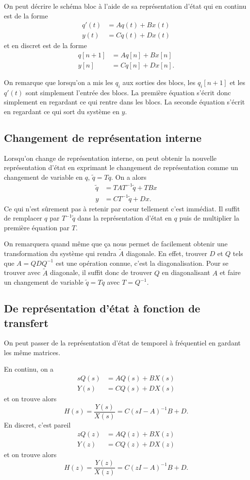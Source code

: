 On peut décrire le schéma bloc à l'aide de sa représentation d'état qui
en continu est de la forme
\begin{align*}
  q'(t) & = Aq(t) + Bx(t)\\
  y(t) & = Cq(t) + Dx(t)
\end{align*}
et en discret est de la forme
\begin{align*}
  q[n+1] & = Aq[n] + Bx[n]\\
  y[n] & = Cq[n] + Dx[n].
\end{align*}

On remarque que lorsqu'on a mis les $q_i$ aux sorties des blocs,
les $q_i[n+1]$ et les $q'(t)$ sont simplement l'entrée des blocs.
La première équation s'écrit donc simplement en regardant ce qui rentre
dans les blocs.
La seconde équation s'écrit en regardant ce qui sort du système en $y$.

\subsection{Changement de représentation interne}
Lorsqu'on change de représentation interne, on peut obtenir
la nouvelle représentation d'état en exprimant le changement de représentation
comme un changement de variable en $q$, $\tilde{q} = Tq$.
On a alors
\begin{align*}
  \tilde{q} & = TAT^{-1}\tilde{q} + TBx\\
  y & = CT^{-1}\tilde{q} + Dx.
\end{align*}
Ce qui n'est sûrement pas à retenir par coeur tellement c'est immédiat.
Il suffit de remplacer $q$ par $T^{-1}\tilde{q}$ dans la représentation d'état
en $q$ puis de multiplier la première équation par $T$.

On remarquera quand même que ça nous permet de facilement obtenir une
transformation du système qui rendra $\tilde{A}$ diagonale.
En effet, trouver $D$ et $Q$ tels que $A = QDQ^{-1}$ est une opération connue,
c'est la diagonalisation.
Pour se trouver avec $\tilde{A}$ diagonale,
il suffit donc de trouver $Q$ en diagonalisant $A$
et faire un changement de variable $\tilde{q} = Tq$ avec $T = Q^{-1}$.

\subsection{De représentation d'état à fonction de transfert}
On peut passer de la représentation d'état de temporel à fréquentiel
en gardant les même matrices.

En continu, on a
\begin{align*}
  sQ(s) & = AQ(s) + BX(s)\\
  Y(s) & = CQ(s) + DX(s)
\end{align*}
et on trouve alors
\[ H(s) = \frac{Y(s)}{X(s)} = C(sI-A)^{-1}B + D. \]
En discret, c'est pareil
\begin{align*}
  zQ(z) & = AQ(z) + BX(z)\\
  Y(z) & = CQ(z) + DX(z)
\end{align*}
et on trouve alors
\[ H(z) = \frac{Y(z)}{X(z)} = C(zI-A)^{-1}B + D. \]


